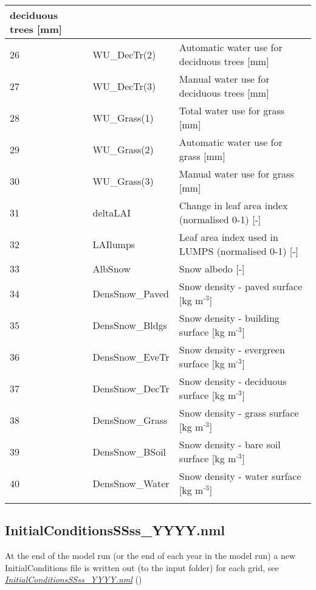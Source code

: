 \documentclass[letterpaper,10pt,english]{sphinxmanual}
\begin{document}
\begin{savenotes}
\begin{longtable}{|l|l|l|}
deciduous trees {[}mm{]}
\\
\hline
26
&
WU\_DecTr(2)
&
Automatic water use
for deciduous trees
{[}mm{]}
\\
\hline
27
&
WU\_DecTr(3)
&
Manual water use for
deciduous trees {[}mm{]}
\\
\hline
28
&
WU\_Grass(1)
&
Total water use for
grass {[}mm{]}
\\
\hline
29
&
WU\_Grass(2)
&
Automatic water use
for grass {[}mm{]}
\\
\hline
30
&
WU\_Grass(3)
&
Manual water use for
grass {[}mm{]}
\\
\hline
31
&
deltaLAI
&
Change in leaf area
index (normalised
0-1) {[}-{]}
\\
\hline
32
&
LAIlumps
&
Leaf area index used
in LUMPS (normalised
0-1) {[}-{]}
\\
\hline
33
&
AlbSnow
&
Snow albedo {[}-{]}
\\
\hline
34
&
DensSnow\_Paved
&
Snow density - paved
surface {[}kg
m$^{\text{-3}}${]}
\\
\hline
35
&
DensSnow\_Bldgs
&
Snow density -
building surface {[}kg
m$^{\text{-3}}${]}
\\
\hline
36
&
DensSnow\_EveTr
&
Snow density -
evergreen surface {[}kg
m$^{\text{-3}}${]}
\\
\hline
37
&
DensSnow\_DecTr
&
Snow density -
deciduous surface {[}kg
m$^{\text{-3}}${]}
\\
\hline
38
&
DensSnow\_Grass
&
Snow density - grass
surface {[}kg
m$^{\text{-3}}${]}
\\
\hline
39
&
DensSnow\_BSoil
&
Snow density - bare
soil surface {[}kg
m$^{\text{-3}}${]}
\\
\hline
40
&
DensSnow\_Water
&
Snow density - water
surface {[}kg
m$^{\text{-3}}${]}
\\
\hline&&\\
\hline
\end{longtable}\sphinxatlongtableend\end{savenotes}


\subsection{InitialConditionsSSss\_YYYY.nml}
\label{\detokenize{output-files:initialconditionsssss-yyyy-nml}}\label{\detokenize{output-files:initialconditionsssss-yyyy-nml-1}}
At the end of the model run (or the end of each year in the model run) a
new InitialConditions file is written out (to the input folder) for each
grid, see
{\hyperref[\detokenize{output-files:InitialConditionsSSss_YYYY.nml}]{\emph{InitialConditionsSSss\_YYYY.nml}}} ()
\end{document}
